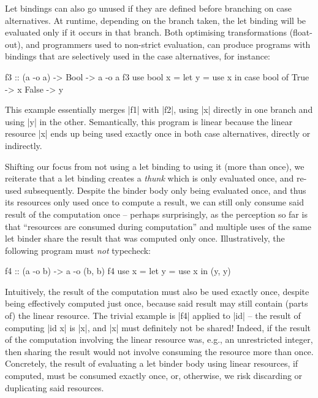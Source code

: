 \documentclass[acmsmall, screen, review]{acmart}
\begin{document}
Let bindings can also go unused if they are defined before branching on case
alternatives. At runtime, depending on the branch taken, the let binding will
be evaluated only if it occurs in that branch.
Both optimising transformations (float-out), and programmers used to non-strict evaluation, can produce
programs with bindings that are selectively used in the case alternatives, for
instance:
%
\begin{notyet}
\begin{code}
f3 :: (a -o a) -> Bool -> a -o a
f3 use bool x =
  let y = use x
  in case bool of
      True -> x
      False -> y
\end{code}
\end{notyet}
%
This example essentially merges |f1| with |f2|, using |x| directly in one
branch and using |y| in the other. Semantically, this program is linear because
the linear resource |x| ends up being used exactly once in both case
alternatives, directly or indirectly.

Shifting our focus from not using a let binding to using it (more than once),
we reiterate that a let binding creates a \emph{thunk} which is only evaluated
once, and re-used subsequently. Despite the binder body only being evaluated
once, and thus its resources only used once to compute a result, we can still
only consume said result of the computation once -- perhaps surprisingly, as the
perception so far is that ``resources are consumed during computation'' and
multiple uses of the same let binder share the result that was computed only
once. Illustratively, the following program must \emph{not} typecheck:
%
\begin{noway}
\begin{code}
f4 :: (a -o b) -> a -o (b, b)
f4 use x =
  let y = use x
  in (y, y)
\end{code}
\end{noway}
%
Intuitively, the result of the computation must also be used exactly once,
despite being effectively computed just once, because said result may still
contain (parts of) the linear resource. The trivial example is |f4| applied to
|id| -- the result of computing |id x| is |x|, and |x| must definitely not be
shared! Indeed, if the result of the computation involving the linear resource
was, e.g., an unrestricted integer, then sharing the result would not involve consuming the
resource more than once.
%
Concretely, the result of evaluating a let binder body using linear resources, if computed, must be
consumed exactly once, or, otherwise, we risk discarding or duplicating said resources.
\end{document}
